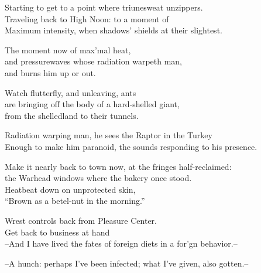 Starting to get to a point where triunesweat unzippers. \\
Traveling back to High Noon: to a moment of \\
Maximum intensity, when shadows' shields at their slightest. 

The moment now of max'mal heat, \\
and pressurewaves whose radiation warpeth man, \\
and burns him up or out. 

Watch flutterfly, and unleaving, ants \\
are bringing off the body of a hard-shelled giant, \\
from the shelledland to their tunnels. 

Radiation warping man, he sees the Raptor in the Turkey \\
Enough to make him paranoid, the sounds responding to his presence. 

Make it nearly back to town now, at the fringes half-reclaimed: \\
the Warhead windows where the bakery once stood. \\
Heatbeat down on unprotected skin, \\
``Brown as a betel-nut in the morning.''

Wrest controls back from Pleasure Center. \\
Get back to business at hand \\

--And I have lived the fates of foreign diets in a for'gn behavior.--

--A hunch: perhaps I've been infected; what I've given, also gotten.--